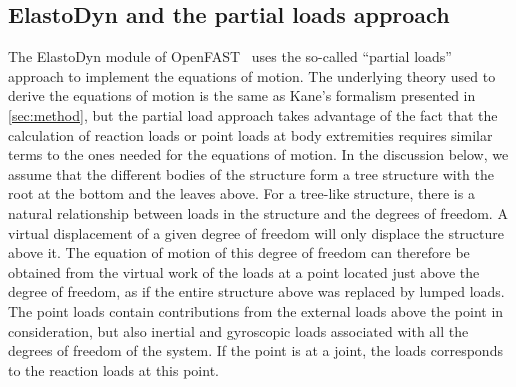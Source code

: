 \documentclass[wes, manuscript]{copernicus}
\newcommand{\m}[1]{\boldsymbol{#1}}
\newcommand{\todoBoth}    [1]{{\colorbox{yellow}{TODO Both:    }}{\color{red}{#1}}\colorbox{yellow}{/}}
\begin{document}

\subsection{ElastoDyn and the partial loads approach}
\label{sec:PartialLoads}
The ElastoDyn module of OpenFAST~\citep{OpenFAST} uses the so-called ``partial loads'' approach to implement the equations of motion.
The underlying theory used to derive the equations of motion is the same as Kane's formalism presented in \autoref{sec:method}, but the partial load approach takes advantage of the fact that the calculation of reaction loads or point loads at body extremities requires similar terms to the ones needed for the equations of motion.
In the discussion below, we assume that the different bodies of the structure form a tree structure with the root at the bottom and the leaves above.
For a tree-like structure, there is a natural relationship between loads in the structure and the degrees of freedom.
A virtual displacement of a given degree of freedom will only displace the structure above it. The equation of motion of this degree of freedom can therefore be obtained from the virtual work of the  loads at a point located just above the degree of freedom, as if the entire structure above was replaced by lumped loads.
The point loads contain contributions from the external loads above the point in consideration, but also inertial and gyroscopic loads associated with all the degrees of freedom of the system. If the point is at a joint, the loads corresponds to the reaction loads at this point.
\end{document}
